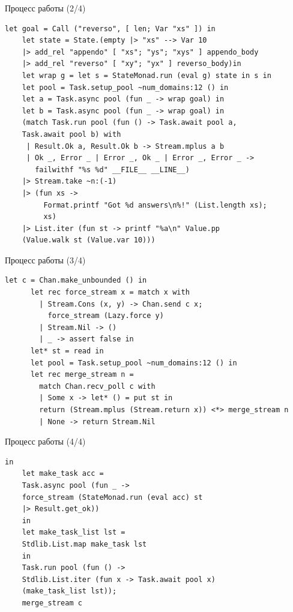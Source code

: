 \documentclass[aspectratio=169]{beamer}
\begin{document}
\begin{frame}[fragile]{Процесс работы (2/4)}
	\begin{lstlisting}[mathescape=true,caption=\textbf{Параллелизация двух revers$^o$ на списках длины 700}, frame=single]
    let goal = Call ("reverso", [ len; Var "xs" ]) in
    let state = State.(empty |> "xs" --> Var 10
    |> add_rel "appendo" [ "xs"; "ys"; "xys" ] appendo_body
    |> add_rel "reverso" [ "xy"; "yx" ] reverso_body)in
    let wrap g = let s = StateMonad.run (eval g) state in s in
    let pool = Task.setup_pool ~num_domains:12 () in
    let a = Task.async pool (fun _ -> wrap goal) in
    let b = Task.async pool (fun _ -> wrap goal) in
    (match Task.run pool (fun () -> Task.await pool a, 
    Task.await pool b) with
     | Result.Ok a, Result.Ok b -> Stream.mplus a b
     | Ok _, Error _ | Error _, Ok _ | Error _, Error _ ->
       failwithf "%s %d" __FILE__ __LINE__)
    |> Stream.take ~n:(-1)
    |> (fun xs ->
         Format.printf "Got %d answers\n%!" (List.length xs);
         xs)
    |> List.iter (fun st -> printf "%a\n" Value.pp 
    (Value.walk st (Value.var 10)))
     \end{lstlisting}
\end{frame}

\begin{frame}[fragile]{Процесс работы (3/4)}
	\begin{lstlisting}[mathescape=true,caption=\textbf{Параллельная реализация Cond$^e$}, frame=single]
    let c = Chan.make_unbounded () in
      let rec force_stream x = match x with
        | Stream.Cons (x, y) -> Chan.send c x;
          force_stream (Lazy.force y)
        | Stream.Nil -> ()
        | _ -> assert false in
      let* st = read in
      let pool = Task.setup_pool ~num_domains:12 () in
      let rec merge_stream n =
        match Chan.recv_poll c with
        | Some x -> let* () = put st in
        return (Stream.mplus (Stream.return x)) <*> merge_stream n
        | None -> return Stream.Nil
     \end{lstlisting}
\end{frame}

\begin{frame}[fragile]{Процесс работы (4/4)}
	\begin{lstlisting}[mathescape=true,caption=\textbf{Параллельная реализация Cond$^e$}, frame=single]
    in
    let make_task acc =
    Task.async pool (fun _ ->
    force_stream (StateMonad.run (eval acc) st
    |> Result.get_ok))
    in
    let make_task_list lst =
    Stdlib.List.map make_task lst
    in
    Task.run pool (fun () ->
    Stdlib.List.iter (fun x -> Task.await pool x)
    (make_task_list lst));
    merge_stream c
     \end{lstlisting}
\end{frame}
\end{document}
